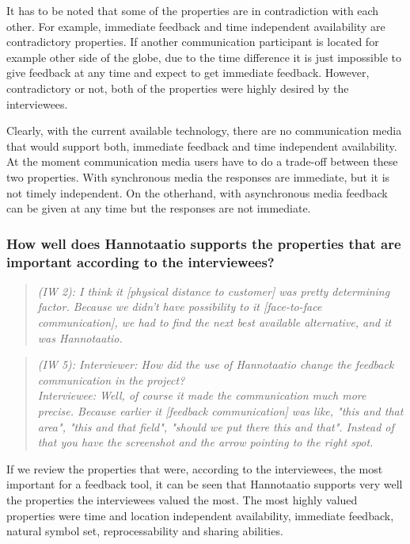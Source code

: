 \documentclass[english,12pt,a4paper,pdftex]{article}
\newcommand{\q}[2]{
\begin{quote}
\emph{(IW #1): #2}
\end{quote}}
\begin{document}
It has to be noted that some of the properties are in contradiction with each other. For example, immediate feedback and time independent availability are contradictory properties. If another communication participant is located for example other side of the globe, due to the time difference it is just impossible to give feedback at any time and expect to get immediate feedback. However, contradictory or not, both of the properties were highly desired by the interviewees.

Clearly, with the current available technology, there are no communication media that would support both, immediate feedback and time independent availability. At the moment communication media users have to do a trade-off between these two properties. With synchronous media the responses are immediate, but it is not timely independent. On the otherhand, with asynchronous media feedback can be given at any time but the responses are not immediate.

\subsubsection{How well does Hannotaatio supports the properties that are important according to the interviewees?}

\q{2}{I think it [physical distance to customer] was pretty determining factor. Because we didn't have possibility to it [face-to-face communication], we had to find the next best available alternative, and it was Hannotaatio.}

\q{5}{Interviewer: How did the use of Hannotaatio change the feedback communication in the project? \\ Interviewee: Well, of course it made the communication much more precise. Because earlier it [feedback communication] was like, "this and that area", "this and that field", "should we put there this and that". Instead of that you have the screenshot and the arrow pointing to the right spot.}

If we review the properties that were, according to the interviewees, the most important for a feedback tool, it can be seen that Hannotaatio supports very well the properties the interviewees valued the most. The most highly valued properties were time and location independent availability, immediate feedback, natural symbol set, reprocessability and sharing abilities. 
\end{document}
